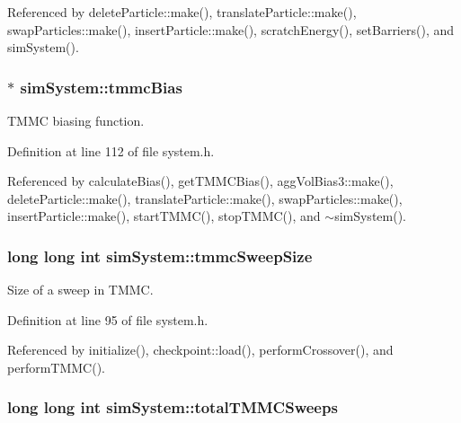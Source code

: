 Referenced by delete\-Particle\-::make(), translate\-Particle\-::make(), swap\-Particles\-::make(), insert\-Particle\-::make(), scratch\-Energy(), set\-Barriers(), and sim\-System().

\hypertarget{classsim_system_a13173f45a1e40a5f5a3552b0ebe15b54}{
\subsubsection[{tmmc\-Bias}]{$\ast$ sim\-System\-::tmmc\-Bias}}\label{classsim_system_a13173f45a1e40a5f5a3552b0ebe15b54}


T\-M\-M\-C biasing function. 



Definition at line 112 of file system.\-h.



Referenced by calculate\-Bias(), get\-T\-M\-M\-C\-Bias(), agg\-Vol\-Bias3\-::make(), delete\-Particle\-::make(), translate\-Particle\-::make(), swap\-Particles\-::make(), insert\-Particle\-::make(), start\-T\-M\-M\-C(), stop\-T\-M\-M\-C(), and $\sim$sim\-System().

\hypertarget{classsim_system_a56e284a361964d0a9ce5c45f41d56ab1}{
\subsubsection[{tmmc\-Sweep\-Size}]{\setlength{\rightskip}{0pt plus 5cm}long long int sim\-System\-::tmmc\-Sweep\-Size}}\label{classsim_system_a56e284a361964d0a9ce5c45f41d56ab1}


Size of a sweep in T\-M\-M\-C. 



Definition at line 95 of file system.\-h.



Referenced by initialize(), checkpoint\-::load(), perform\-Crossover(), and perform\-T\-M\-M\-C().

\hypertarget{classsim_system_a78b107e20bcbf2f818264fa076de5db3}{
\subsubsection[{total\-T\-M\-M\-C\-Sweeps}]{\setlength{\rightskip}{0pt plus 5cm}long long int sim\-System\-::total\-T\-M\-M\-C\-Sweeps}}\label{classsim_system_a78b107e20bcbf2f818264fa076de5db3}


